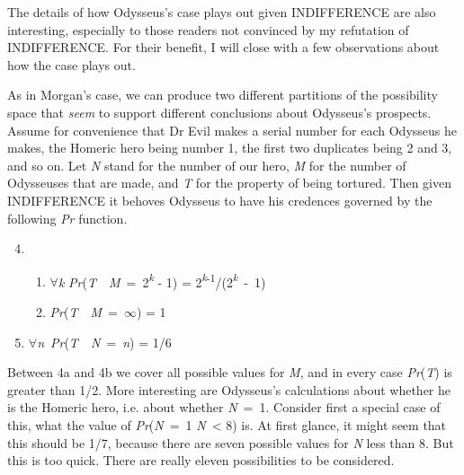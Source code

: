 The details of how Odysseus's case plays out given INDIFFERENCE are also interesting, especially to those readers not convinced by my refutation of INDIFFERENCE. For their benefit, I will close with a few observations about how the case plays out.

As in Morgan's case, we can produce two different partitions of the possibility space that \textit{seem} to support different conclusions about Odysseus's prospects. Assume for convenience that Dr Evil makes a serial number for each Odysseus he makes, the Homeric hero being number 1, the first two duplicates being 2 and 3, and so on. Let \textit{N} stand for the number of our hero, \textit{M} for the number of Odysseuses that are made, and \textit{T} for the property of being tortured. Then given INDIFFERENCE it behoves Odysseus to have his credences governed by the following \textit{Pr} function.

\begin{enumerate}
\setcounter{enumi}{3}
\item
\begin{enumerate}
\item ${\forall}$\textit{k} \textit{Pr}(\textit{T}~{\textbar}~\textit{M}~=~2\textit{\textsuperscript{k}} \nobreakdash- 1) = 2\textit{\textsuperscript{k}}\textsuperscript{{}-1}/(2\textit{\textsuperscript{k}}~-~1)
\item \textit{Pr}(\textit{T}~{\textbar}~\textit{M}~=~${\infty}$) = 1
\end{enumerate}
\item ${\forall}$\textit{n}~\textit{Pr}(\textit{T}~{\textbar}~\textit{N}~=~\textit{n}) = 1/6
\end{enumerate}

\noindent Between 4a and 4b we cover all possible values for \textit{M}, and in every case \textit{Pr}(\textit{T}) is greater than 1/2. More interesting are Odysseus's calculations about whether he is the Homeric hero, i.e. about whether \textit{N}~=~1. Consider first a special case of this, what the value of \textit{Pr}(\textit{N}~=~1 {\textbar} \textit{N}~{\textless} 8) is. At first glance, it might seem that this should be 1/7, because there are seven possible values for \textit{N} less than 8. But this is too quick. There are really eleven possibilities to be considered.


